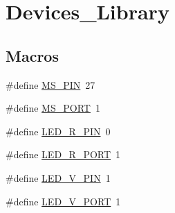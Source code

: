 \hypertarget{group___devices___library}{}\section{Devices\+\_\+\+Library}
\label{group___devices___library}
\subsection*{Macros}
\begin{DoxyCompactItemize}
\item 
\#define \hyperlink{group___devices___library_ga3ea9ecb7907af23b0d59637a7e778d47}{M\+S\+\_\+\+P\+I\+N}~27
\item 
\#define \hyperlink{group___devices___library_gaf98ad77692941c0b1abe1a1a399bceea}{M\+S\+\_\+\+P\+O\+R\+T}~1
\item 
\#define \hyperlink{group___devices___library_ga22f3cf4ef9dadad8d78d5c59999100b6}{L\+E\+D\+\_\+\+R\+\_\+\+P\+I\+N}~0
\item 
\#define \hyperlink{group___devices___library_ga5a11a7cbc215e25401541277460113a4}{L\+E\+D\+\_\+\+R\+\_\+\+P\+O\+R\+T}~1
\item 
\#define \hyperlink{group___devices___library_gaefaaa0f7c44f79a6150287630f9531d6}{L\+E\+D\+\_\+\+V\+\_\+\+P\+I\+N}~1
\item 
\#define \hyperlink{group___devices___library_gab09c8e054071dd324e1527eadec02adf}{L\+E\+D\+\_\+\+V\+\_\+\+P\+O\+R\+T}~1
\end{DoxyCompactItemize}
